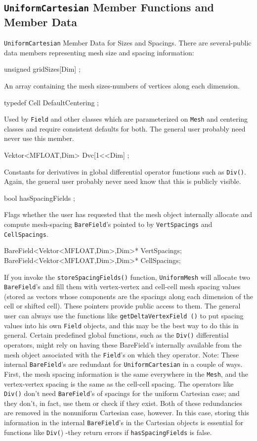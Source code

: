 \subsection{\texttt{UniformCartesian} Member Functions and Member Data} 
\texttt{UniformCartesian} Member Data for Sizes and Spacings. There are several-public data members representing mesh size and spacing information: 
\begin{smallcode}
unsigned gridSizes[Dim] ;
\end{smallcode}
An array containing the mesh sizes-numbers of vertices along each dimension. 
\begin{smallcode}
typedef Cell DefaultCentering ;
\end{smallcode} 
Used by \texttt{Field} and other classes which are parameterized on \texttt{Mesh} and centering classes and require consistent defaults for both. 
The general user probably need never use this member. 
\begin{smallcode}
Vektor<MFLOAT,Dim> Dvc[1<<Dim] ;
\end{smallcode}
Constants for derivatives in global differential operator functions such as \texttt{Div()}. Again, the general user probably never need know that this is publicly visible.  
\begin{smallcode}
bool hasSpacingFields ;
\end{smallcode}
Flags whether the user has requested that the mesh object internally allocate and compute mesh-spacing \texttt{BareField}'s pointed to by \texttt{VertSpacings} and \\ \texttt{CellSpacings}. 
\begin{smallcode}
BareField<Vektor<MFLOAT,Dim>,Dim>* VertSpacings; 
BareField<Vektor<MFLOAT,Dim>,Dim>* CellSpacings;
\end{smallcode}
If you invoke the \texttt{storeSpacingFields()} function, \texttt{UniformMesh} will allocate two \texttt{BareField}'s and fill them with vertex-vertex and cell-cell mesh spacing values 
(stored as vectors whose components are the spacings along each dimension of the cell or shifted cell). These pointers provide public access to them. 
The general user can always use the functions like \texttt{getDeltaVertexField ()} to put spacing values into his own \texttt{Field} objects, and this may be the best way to do this in general. 
Certain predefined \ippl global functions, such as the \texttt{Div()} differential operators, might rely on having these BareField's internally available from the mesh object associated with 
the \texttt{Field}'s on which they operator. 
Note: These internal \texttt{BareField}'s are redundant for \texttt{UniformCartesian} in a couple of ways. First, the mesh spacing information is the same everywhere in the \texttt{Mesh}, 
and the vertex-vertex spacing is the same as the cell-cell spacing. The operators like \texttt{Div()} don't need \texttt{BareField}'s of spacings for the uniform Cartesian case; and they don't, 
in fact, use them or check if they exist. Both of these redundancies are removed in the nonuniform Cartesian case, however. In this case, storing this information in the internal 
\texttt{BareField}'s in the Cartesian objects is essential for functions like \texttt{Div(}) -they return errors if \texttt{hasSpacingFields} is false. 


